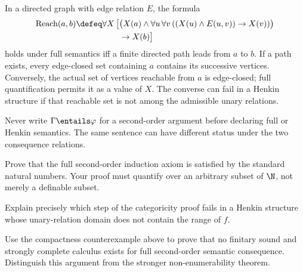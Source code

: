 \begin{example}[Reachability]
In a directed graph with edge relation \(E\), the formula
\[
\begin{aligned}
  \operatorname{Reach}(a,b)\defeq
  \forall X\,\bigl[&
    \bigl(X(a)\land
      \forall u\,\forall v\,
      ((X(u)\land E(u,v))\to X(v))\bigr)\\
    &\to X(b)
  \bigr]
\end{aligned}
\]
holds under full semantics iff a finite directed path leads from
\(a\) to \(b\).  If a path exists, every edge-closed set containing \(a\)
contains its successive vertices.  Conversely, the actual set of vertices
reachable from \(a\) is edge-closed; full quantification permits it as a value
of \(X\).  The converse can fail in a Henkin structure if that reachable set
is not among the admissible unary relations.
\end{example}

\begin{warning}
Never write \(\Gamma\entails\varphi\) for a second-order argument before
declaring full or Henkin semantics.  The same sentence can have different
status under the two consequence relations.
\end{warning}

\begin{exercise}
\label{ex:second-order-logic-01}
Prove that the full second-order induction axiom is satisfied by the standard
natural numbers.  Your proof must quantify over an arbitrary subset of
\(\N\), not merely a definable subset.
\end{exercise}

\begin{exercise}
\label{ex:second-order-logic-02}
Explain precisely which step of the categoricity proof fails in a Henkin
structure whose unary-relation domain does not contain the range of \(f\).
\end{exercise}

\begin{exercise}
\label{ex:second-order-logic-03}
Use the compactness counterexample above to prove that no finitary sound and
strongly complete calculus exists for full second-order semantic consequence.
Distinguish this argument from the stronger non-enumerability theorem.
\end{exercise}

